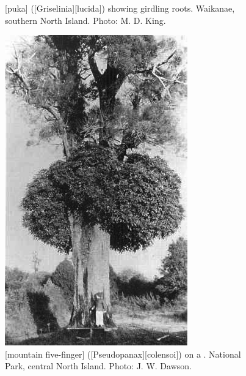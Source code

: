\begin{figure}[t]
\begin{minipage}[t]{0.9\textwidth}
\begin{minipage}[t]{(\textwidth-\fgap) * \real{0.422}}
			\caption[Puka (\emph{Griselinia lucida}) showing girdling roots]{[puka] ([Griselinia][lucida]) showing girdling roots.
			Waikanae, southern North Island.
			Photo: M. D. King.}%
			\label{fig:48puka-roots}
		\end{minipage}\hspace{\fgap}%
		\begin{minipage}[t]{(\textwidth-\fgap) * \real{0.578}}
			\centering
			\includegraphics[width=\textwidth]{graphics/fig_049}
			\caption[Mountain five-finger on a kahikatea]{[mountain five-finger] ([Pseudopanax][colensoi]) on a .
			National Park, central North Island.
			Photo: J. W. Dawson.}%
			\label{fig:49fivefinger}
		\end{minipage}
	\end{minipage}
\end{figure}

